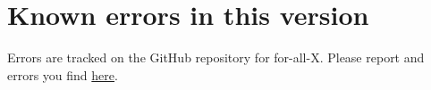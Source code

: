 \chapter*{Known errors in this version}
\label{ch.errors}

Errors are tracked on the GitHub repository for for-all-X. Please report and errors you find \href{https://github.com/lauragreenstreet/for-all-x/issues}{here}.